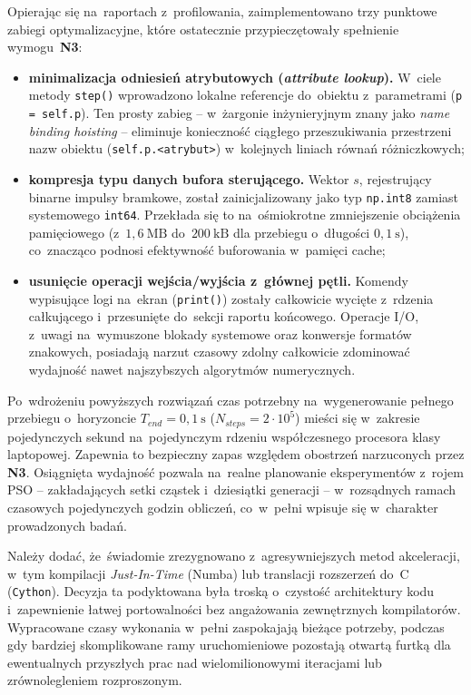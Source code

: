 Opierając się na~raportach z~profilowania, zaimplementowano trzy punktowe zabiegi optymalizacyjne, które ostatecznie przypieczętowały spełnienie wymogu~\textbf{N3}:

\begin{itemize}
    \item \textbf{minimalizacja odniesień atrybutowych (\emph{attribute lookup}).} W~ciele metody \texttt{step()} wprowadzono lokalne referencje do~obiektu z~parametrami (\texttt{p = self.p}). Ten prosty zabieg -- w~żargonie inżynieryjnym znany jako \emph{name binding hoisting} -- eliminuje konieczność ciągłego przeszukiwania przestrzeni nazw obiektu (\texttt{self.p.<atrybut>}) w~kolejnych liniach równań różniczkowych;
    \item \textbf{kompresja typu danych bufora sterującego.} Wektor $s$, rejestrujący binarne impulsy bramkowe, został zainicjalizowany jako typ \texttt{np.int8} zamiast systemowego \texttt{int64}. Przekłada się to na~ośmiokrotne zmniejszenie obciążenia pamięciowego (z~$1{,}6~\mathrm{MB}$ do~$200~\mathrm{kB}$ dla przebiegu o~długości $0{,}1~\mathrm{s}$), co~znacząco podnosi efektywność buforowania w~pamięci cache;
    \item \textbf{usunięcie operacji wejścia/wyjścia z~głównej pętli.} Komendy wypisujące logi na~ekran (\texttt{print()}) zostały całkowicie wycięte z~rdzenia całkującego i~przesunięte do~sekcji raportu końcowego. Operacje I/O, z~uwagi na~wymuszone blokady systemowe oraz konwersje formatów znakowych, posiadają narzut czasowy zdolny całkowicie zdominować wydajność nawet najszybszych algorytmów numerycznych.
\end{itemize}

Po~wdrożeniu powyższych rozwiązań czas potrzebny na~wygenerowanie pełnego przebiegu o~horyzoncie $T_{end}=0{,}1~\mathrm{s}$ ($N_{steps}=2\cdot 10^5$) mieści się w~zakresie pojedynczych sekund na~pojedynczym rdzeniu współczesnego procesora klasy laptopowej. Zapewnia to bezpieczny zapas względem obostrzeń narzuconych przez \textbf{N3}. Osiągnięta wydajność pozwala na~realne planowanie eksperymentów z~rojem PSO -- zakładających setki cząstek i~dziesiątki generacji -- w~rozsądnych ramach czasowych pojedynczych godzin obliczeń, co~w~pełni wpisuje się w~charakter prowadzonych badań.

Należy dodać, że~świadomie zrezygnowano z~agresywniejszych metod akceleracji, w~tym kompilacji \emph{Just-In-Time} (Numba) lub translacji rozszerzeń do~C (\texttt{Cython}). Decyzja ta podyktowana była troską o~czystość architektury kodu i~zapewnienie łatwej portowalności bez angażowania zewnętrznych kompilatorów. Wypracowane czasy wykonania w~pełni zaspokajają bieżące potrzeby, podczas gdy bardziej skomplikowane ramy uruchomieniowe pozostają otwartą furtką dla ewentualnych przyszłych prac nad wielomilionowymi iteracjami lub zrównolegleniem rozproszonym.

